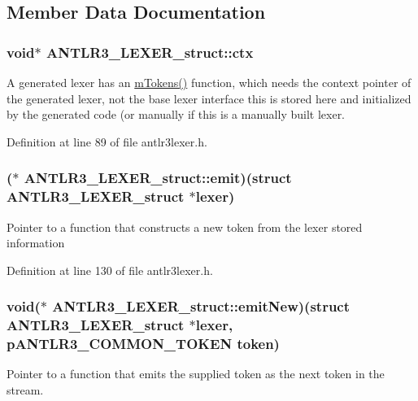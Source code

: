 \subsection{Member Data Documentation}
\hypertarget{struct_a_n_t_l_r3___l_e_x_e_r__struct_aa8c9ab64d60b659c71263c2f2a39779a}{
\subsubsection[{ctx}]{\setlength{\rightskip}{0pt plus 5cm}void$\ast$ A\-N\-T\-L\-R3\-\_\-\-L\-E\-X\-E\-R\-\_\-struct\-::ctx}}\label{struct_a_n_t_l_r3___l_e_x_e_r__struct_aa8c9ab64d60b659c71263c2f2a39779a}
A generated lexer has an \hyperlink{struct_a_n_t_l_r3___l_e_x_e_r__struct_af9c91981f78a7d27002934024b024fc0}{m\-Tokens()} function, which needs the context pointer of the generated lexer, not the base lexer interface this is stored here and initialized by the generated code (or manually if this is a manually built lexer. 

Definition at line 89 of file antlr3lexer.\-h.

\hypertarget{struct_a_n_t_l_r3___l_e_x_e_r__struct_a5200cf32fbc130ee638ceee2be66bd4d}{
\subsubsection[{emit}]{($\ast$ A\-N\-T\-L\-R3\-\_\-\-L\-E\-X\-E\-R\-\_\-struct\-::emit)(struct {\bf A\-N\-T\-L\-R3\-\_\-\-L\-E\-X\-E\-R\-\_\-struct} $\ast$lexer)}}\label{struct_a_n_t_l_r3___l_e_x_e_r__struct_a5200cf32fbc130ee638ceee2be66bd4d}
Pointer to a function that constructs a new token from the lexer stored information 

Definition at line 130 of file antlr3lexer.\-h.

\hypertarget{struct_a_n_t_l_r3___l_e_x_e_r__struct_a59104ea186b3ad9ce763dc1feee71bd4}{
\subsubsection[{emit\-New}]{\setlength{\rightskip}{0pt plus 5cm}void($\ast$ A\-N\-T\-L\-R3\-\_\-\-L\-E\-X\-E\-R\-\_\-struct\-::emit\-New)(struct {\bf A\-N\-T\-L\-R3\-\_\-\-L\-E\-X\-E\-R\-\_\-struct} $\ast$lexer, {\bf p\-A\-N\-T\-L\-R3\-\_\-\-C\-O\-M\-M\-O\-N\-\_\-\-T\-O\-K\-E\-N} token)}}\label{struct_a_n_t_l_r3___l_e_x_e_r__struct_a59104ea186b3ad9ce763dc1feee71bd4}
Pointer to a function that emits the supplied token as the next token in the stream. 


